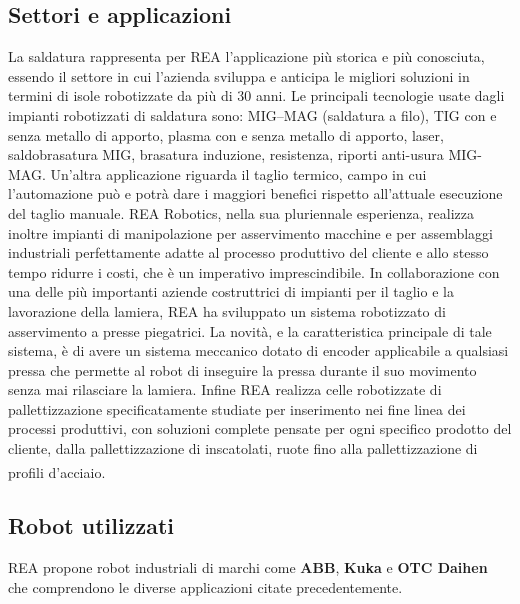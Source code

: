 \subsection{Settori e applicazioni}
La saldatura rappresenta per REA l'applicazione più storica e più conosciuta, essendo il settore in cui l'azienda sviluppa e anticipa le migliori soluzioni in termini di isole robotizzate da più di 30 anni. Le principali tecnologie usate dagli impianti robotizzati di saldatura sono: MIG–MAG (saldatura a filo), TIG con e senza metallo di apporto, plasma con e senza metallo di apporto, laser, saldobrasatura MIG, brasatura induzione, resistenza, riporti anti-usura MIG-MAG. Un'altra applicazione riguarda il taglio termico, campo in cui l'automazione può e potrà dare i maggiori benefici rispetto all'attuale esecuzione del taglio manuale. REA Robotics, nella sua pluriennale esperienza, realizza inoltre impianti di manipolazione per asservimento macchine e per assemblaggi industriali perfettamente adatte al processo produttivo del cliente e allo stesso tempo ridurre i costi, che è un imperativo imprescindibile. In collaborazione con una delle più importanti aziende costruttrici di impianti per il taglio e la lavorazione della lamiera, REA ha sviluppato un sistema robotizzato di asservimento a presse piegatrici. La novità, e la caratteristica principale di tale sistema, è di avere un sistema meccanico dotato di encoder applicabile a qualsiasi pressa che permette al robot di inseguire la pressa durante il suo movimento senza mai rilasciare la lamiera. Infine REA realizza celle robotizzate di pallettizzazione specificatamente studiate per inserimento nei fine linea dei processi produttivi, con soluzioni complete pensate per ogni specifico prodotto del cliente, dalla pallettizzazione di inscatolati, ruote fino alla pallettizzazione di profili d'acciaio.\textsuperscript{\cite{spaziowebpdf}}

\subsection{Robot utilizzati}
REA propone robot industriali di marchi come \textbf{ABB}, \textbf{Kuka} e \textbf{OTC Daihen} che comprendono le diverse applicazioni citate precedentemente.
